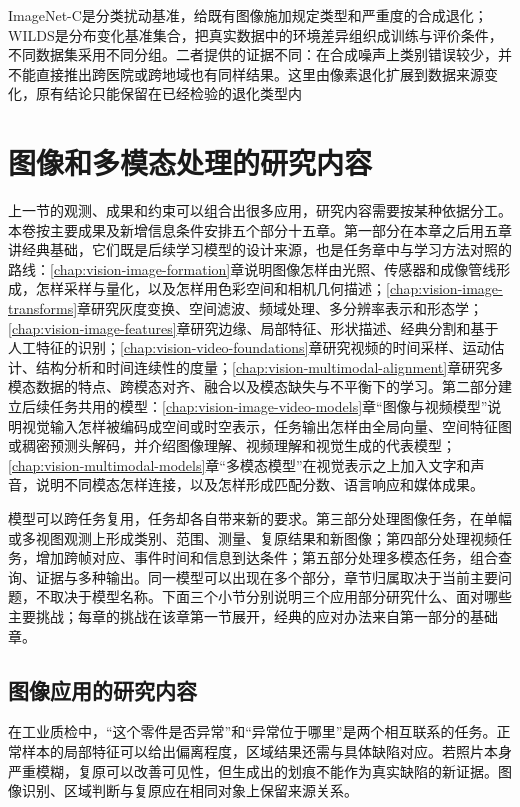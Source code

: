 ImageNet-C是分类扰动基准，给既有图像施加规定类型和严重度的合成退化；WILDS是分布变化基准集合，把真实数据中的环境差异组织成训练与评价条件，不同数据集采用不同分组。二者提供的证据不同：在合成噪声上类别错误较少，并不能直接推出跨医院或跨地域也有同样结果。这里由像素退化扩展到数据来源变化，原有结论只能保留在已经检验的退化类型内

\section{图像和多模态处理的研究内容}
\label{sec:vision-overview-tasks}

上一节的观测、成果和约束可以组合出很多应用，研究内容需要按某种依据分工。本卷按主要成果及新增信息条件安排五个部分十五章。第一部分在本章之后用五章讲经典基础，它们既是后续学习模型的设计来源，也是任务章中与学习方法对照的路线：\ref{chap:vision-image-formation}章说明图像怎样由光照、传感器和成像管线形成，怎样采样与量化，以及怎样用色彩空间和相机几何描述；\ref{chap:vision-image-transforms}章研究灰度变换、空间滤波、频域处理、多分辨率表示和形态学；\ref{chap:vision-image-features}章研究边缘、局部特征、形状描述、经典分割和基于人工特征的识别；\ref{chap:vision-video-foundations}章研究视频的时间采样、运动估计、结构分析和时间连续性的度量；\ref{chap:vision-multimodal-alignment}章研究多模态数据的特点、跨模态对齐、融合以及模态缺失与不平衡下的学习。第二部分建立后续任务共用的模型：\ref{chap:vision-image-video-models}章“图像与视频模型”说明视觉输入怎样被编码成空间或时空表示，任务输出怎样由全局向量、空间特征图或稠密预测头解码，并介绍图像理解、视频理解和视觉生成的代表模型；\ref{chap:vision-multimodal-models}章“多模态模型”在视觉表示之上加入文字和声音，说明不同模态怎样连接，以及怎样形成匹配分数、语言响应和媒体成果。

模型可以跨任务复用，任务却各自带来新的要求。第三部分处理图像任务，在单幅或多视图观测上形成类别、范围、测量、复原结果和新图像；第四部分处理视频任务，增加跨帧对应、事件时间和信息到达条件；第五部分处理多模态任务，组合查询、证据与多种输出。同一模型可以出现在多个部分，章节归属取决于当前主要问题，不取决于模型名称。下面三个小节分别说明三个应用部分研究什么、面对哪些主要挑战；每章的挑战在该章第一节展开，经典的应对办法来自第一部分的基础章。

\subsection{图像应用的研究内容}
\label{sec:vision-overview-image-tasks}

在工业质检中，“这个零件是否异常”和“异常位于哪里”是两个相互联系的任务。正常样本的局部特征可以给出偏离程度，区域结果还需与具体缺陷对应。若照片本身严重模糊，复原可以改善可见性，但生成出的划痕不能作为真实缺陷的新证据。图像识别、区域判断与复原应在相同对象上保留来源关系。

